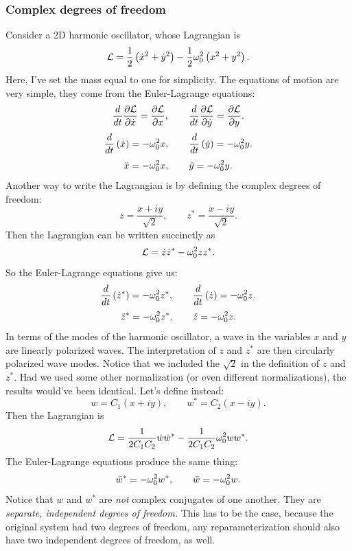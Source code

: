 \documentclass[12pt]{article}
\begin{document}
\subsubsection{Complex degrees of freedom}
Consider a 2D harmonic oscillator, whose Lagrangian is
\[ \mathcal{L} = \frac{1}{2} \left( \dot x ^2 + \dot y^2\right) - \frac{1}{2} \omega_0^2 
\left(x^2 + y^2\right).\]
Here, I've set the mass equal to one for simplicity. The equations 
of motion are very simple, they come from the Euler-Lagrange equations:
\[ \frac{d {}}{d {t}} \frac{\partial {\mathcal L}}{\partial {\dot x}} = \frac{\partial {\mathcal L}}{\partial {x}}, \qquad \frac{d {}}{d {t}} 
\frac{\partial {\mathcal L}}{\partial {\dot y}} = \frac{\partial {\mathcal L}}{\partial {y}}.\]
\[ \frac{d {}}{d {t}} \left(\dot x\right) = -\omega_0^2 x, \qquad \frac{d {}}{d {t}} \left(\dot y\right) = 
-\omega_0^2 y.\]
\[ \ddot x = -\omega_0^2 x, \qquad \ddot y = -\omega_0^2 y.\]
Another way to write the Lagrangian is by defining the complex degrees of 
freedom:
\[ z = \frac{x+iy}{\sqrt{2}} ,\qquad z^* = \frac{x-iy}{\sqrt 2}.\]
Then the Lagrangian can be written succinctly as
\[ \mathcal L = \dot z \dot z^* - \omega_0^2 z z^*.\]
So the Euler-Lagrange equations give us:
\[ \frac{d {}}{d {t}}\left( \dot z^* \right) = -\omega_0^2 z^*, \qquad \frac{d {}}{d {t}}\left( \dot z\right) = 
-\omega_0^2 z.\]
\[ \ddot z^* = -\omega_0^2 z^*, \qquad \ddot z = -\omega_0^2 z.\]
In terms of the modes of the harmonic oscillator, a wave in the variables $x$ 
and $y$ are linearly polarized waves. The interpretation of $z$ and $z^*$ are 
then circularly polarized wave modes. Notice that we included the $\sqrt{2}$ in 
the definition of $z$ and $z^*$. Had we used some other normalization (or even 
different normalizations), the results would've been identical. Let's define 
instead:
\[ w = C_1(x+iy),\qquad w^* = C_2(x-iy).\]
Then the Lagrangian is
\[ \mathcal L = \frac{1}{2 C_1 C_2} \dot w \dot w^* - \frac{1}{2C_1 C_2}\omega_0^2 w 
w^*.\]
The Euler-Lagrange equations produce the same thing:
\[ \ddot w^* = -\omega_0^2 w^*, \qquad \ddot w = -\omega_0^2 w.\]
Notice that $w$ and $w^*$ are \emph{not} complex conjugates of one another. 
They are \emph{separate, independent degrees of freedom.} This has to be the 
case, because the original system had two degrees of freedom, any 
reparameterization should also have two independent degrees of freedom, as 
well.

\hrulefill
\end{document}
